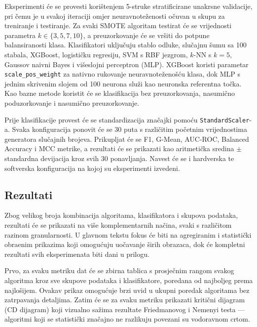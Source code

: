 Eksperimenti \'{c}e se provesti kori\v{s}tenjem 5-struke stratificirane
unakrsne validacije, pri \v{c}emu je u svakoj iteraciji omjer
neuravnote\v{z}enosti o\v{c}uvan u skupu za treniranje i testiranje. Za
svaki SMOTE algoritam testirat \'{c}e se vrijednosti parametra
$k \in \{3, 5, 7, 10\}$, a preuzorkovanje \'{c}e se vr\v{s}iti do
potpune balansiranosti klasa. Klasifikatori uklju\v{c}uju stablo odluke,
slu\v{c}ajnu \v{s}umu sa 100 stabala, XGBoost, logisti\v{c}ku regresiju,
SVM s RBF jezgrom, $k$-NN s $k=5$, Gaussov naivni Bayes i vi\v{s}eslojni
perceptron (MLP). XGBoost koristi parametar \texttt{scale\_pos\_weight}
za nativno rukovanje neuravnote\v{z}eno\v{s}\'{c}u klasa, dok MLP
s jednim skrivenim slojem od 100 neurona slu\v{z}i kao neuronska
referentna to\v{c}ka. Kao bazne metode koristit
\'{c}e se klasifikacija bez preuzorkovanja, nasumi\v{c}no poduzorkovanje
i nasumi\v{c}no preuzorkovanje.

Prije klasifikacije provest \'{c}e se standardizacija zna\v{c}ajki
pomo\'{c}u \texttt{StandardScaler}-a. Svaka konfiguracija ponovit
\'{c}e se 30 puta s razli\v{c}itim po\v{c}etnim vrijednostima generatora
slu\v{c}ajnih brojeva. Prikupljat \'{c}e se F1, G-Mean, AUC-ROC,
Balanced Accuracy i MCC metrike, a rezultati \'{c}e se prikazati kao
aritmeti\v{c}ka sredina $\pm$ standardna devijacija kroz svih 30
ponavljanja. Navest \'{c}e se i hardverska te softverska konfiguracija
na kojoj su eksperimenti izvedeni.

\subsection{Rezultati}

Zbog velikog broja kombinacija algoritama, klasifikatora i skupova
podataka, rezultati \'{c}e se prikazati na vi\v{s}e komplementarnih
na\v{c}ina, svaki s razli\v{c}itom razinom granularnosti. U glavnom
tekstu fokus \'{c}e biti na agregiranim i statisti\v{c}ki obra\dj{}enim
prikazima koji omogu\'{c}uju uo\v{c}avanje \v{s}irih obrazaca, dok
\'{c}e kompletni rezultati svih eksperimenata biti dani u prilogu.

Prvo, za svaku metriku dat \'{c}e se zbirna tablica s prosje\v{c}nim
rangom svakog algoritma kroz sve skupove podataka i klasifikatore,
poredana od najboljeg prema najlo\v{s}ijem. Ovakav prikaz omogu\'{c}uje
brzi uvid u ukupni poredak algoritama bez zatrpavanja detaljima.
Zatim \'{c}e se za svaku metriku prikazati kriti\v{c}ni dijagram
(CD dijagram) koji vizualno sa\v{z}ima rezultate Friedmanovog i Nemenyi
testa --- algoritmi koji se statisti\v{c}ki zna\v{c}ajno ne razlikuju
povezani su vodoravnom crtom.

